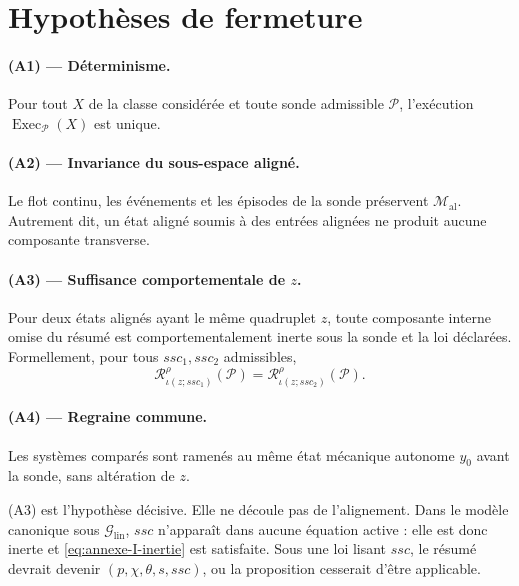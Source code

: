 \section{Hypothèses de fermeture}
\label{annexe-I-hypotheses}

\paragraph{(A1) --- Déterminisme.}
Pour tout $X$ de la classe considérée et toute sonde admissible
$\mathcal P$, l'exécution $\operatorname{Exec}_{\mathcal P}(X)$ est
unique.

\paragraph{(A2) --- Invariance du sous-espace aligné.}
Le flot continu, les événements et les épisodes de la sonde préservent
$\mathcal M_{\mathrm{al}}$. Autrement dit, un état aligné soumis à des
entrées alignées ne produit aucune composante transverse.

\paragraph{(A3) --- Suffisance comportementale de $z$.}
Pour deux états alignés ayant le même quadruplet $z$, toute composante
interne omise du résumé est comportementalement inerte sous la sonde et
la loi déclarées. Formellement, pour tous $ssc_1,ssc_2$ admissibles,
\begin{equation}
\label{eq:annexe-I-inertie}
\mathcal R_{\iota(z;ssc_1)}^\rho(\mathcal P)
=
\mathcal R_{\iota(z;ssc_2)}^\rho(\mathcal P).
\end{equation}

\paragraph{(A4) --- Regraine commune.}
Les systèmes comparés sont ramenés au même état mécanique autonome
$y_0$ avant la sonde, sans altération de $z$.

\begin{encadre}[title={Statut de l'hypothèse markovienne}]
(A3) est l'hypothèse décisive. Elle ne découle pas de l'alignement. Dans
le modèle canonique sous $\mathcal G_{\mathrm{lin}}$, $ssc$ n'apparaît
dans aucune équation active : elle est donc inerte et
\eqref{eq:annexe-I-inertie} est satisfaite. Sous une loi lisant $ssc$,
le résumé devrait devenir $(p,\chi,\theta,s,ssc)$, ou la proposition
cesserait d'être applicable.
\end{encadre}

